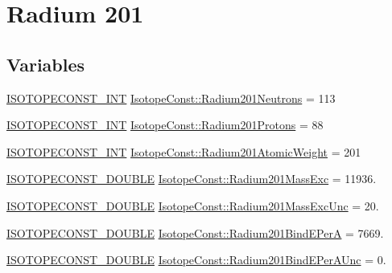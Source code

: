 \hypertarget{group___isotope_const-_radium-_ra201}{}\section{Radium 201}
\label{group___isotope_const-_radium-_ra201}
\subsection*{Variables}
\begin{DoxyCompactItemize}
\item 
\mbox{\hyperlink{group___isotope_const-_macros_ga5f18360b3e99483a35c32d789e62621c}{I\+S\+O\+T\+O\+P\+E\+C\+O\+N\+S\+T\+\_\+\+I\+NT}} \mbox{\hyperlink{group___isotope_const-_radium-_ra201_gab5e0bcde5a255efe06cd2a5465e4c760}{Isotope\+Const\+::\+Radium201\+Neutrons}} = 113
\item 
\mbox{\hyperlink{group___isotope_const-_macros_ga5f18360b3e99483a35c32d789e62621c}{I\+S\+O\+T\+O\+P\+E\+C\+O\+N\+S\+T\+\_\+\+I\+NT}} \mbox{\hyperlink{group___isotope_const-_radium-_ra201_ga4cd44664dc8c9cf7c6b365e1a4b6769a}{Isotope\+Const\+::\+Radium201\+Protons}} = 88
\item 
\mbox{\hyperlink{group___isotope_const-_macros_ga5f18360b3e99483a35c32d789e62621c}{I\+S\+O\+T\+O\+P\+E\+C\+O\+N\+S\+T\+\_\+\+I\+NT}} \mbox{\hyperlink{group___isotope_const-_radium-_ra201_gad2c6aa7f80af8766b5d13ec021b444d7}{Isotope\+Const\+::\+Radium201\+Atomic\+Weight}} = 201
\item 
\mbox{\hyperlink{group___isotope_const-_macros_ga8f45a7272ce02c0b4c65c44636ed719a}{I\+S\+O\+T\+O\+P\+E\+C\+O\+N\+S\+T\+\_\+\+D\+O\+U\+B\+LE}} \mbox{\hyperlink{group___isotope_const-_radium-_ra201_ga0831d8fd367786e58419b529fef143d1}{Isotope\+Const\+::\+Radium201\+Mass\+Exc}} = 11936.
\item 
\mbox{\hyperlink{group___isotope_const-_macros_ga8f45a7272ce02c0b4c65c44636ed719a}{I\+S\+O\+T\+O\+P\+E\+C\+O\+N\+S\+T\+\_\+\+D\+O\+U\+B\+LE}} \mbox{\hyperlink{group___isotope_const-_radium-_ra201_ga16e217ab291d84a2ee2912850d0b28b5}{Isotope\+Const\+::\+Radium201\+Mass\+Exc\+Unc}} = 20.
\item 
\mbox{\hyperlink{group___isotope_const-_macros_ga8f45a7272ce02c0b4c65c44636ed719a}{I\+S\+O\+T\+O\+P\+E\+C\+O\+N\+S\+T\+\_\+\+D\+O\+U\+B\+LE}} \mbox{\hyperlink{group___isotope_const-_radium-_ra201_gae740962cba10bdea8d09f44272291a98}{Isotope\+Const\+::\+Radium201\+Bind\+E\+PerA}} = 7669.
\item 
\mbox{\hyperlink{group___isotope_const-_macros_ga8f45a7272ce02c0b4c65c44636ed719a}{I\+S\+O\+T\+O\+P\+E\+C\+O\+N\+S\+T\+\_\+\+D\+O\+U\+B\+LE}} \mbox{\hyperlink{group___isotope_const-_radium-_ra201_gaa7e7e4e9702e01d3497fac1218be2d7e}{Isotope\+Const\+::\+Radium201\+Bind\+E\+Per\+A\+Unc}} = 0.

\end{DoxyCompactItemize}
